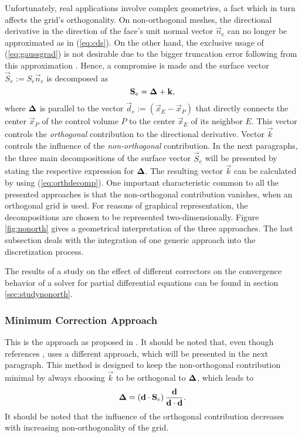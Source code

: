 Unfortunately, real applications involve complex geometries, a fact which in turn affects the grid's orthogonality. On non-orthogonal meshes, the directional derivative in the direction of the face's unit normal vector \(\vec{n}_e\) can no longer be approximated as in (\ref{eq:cds}). On the other hand, the exclusive usage of (\ref{eq:gaussgrad}) is not desirable due to the bigger truncation error following from this approximation \cite{jasak96}. Hence, a compromise is made and the surface vector \(\vec{S}_e := S_e \vec{n}_e\) is decomposed as
\begin{equation}
  \label{eq:orthdecomp}
  \mathbf{S}_e = \boldsymbol{\Delta} + \mathbf{k},
\end{equation}
where \(\boldsymbol{\Delta}\) is parallel to the vector \(\vec{d}_e := \left(\vec{x}_E - \vec{x}_P\right)\) that directly connects the center \(\vec{x}_P\) of the control volume \(P\) to the center \(\vec{x}_E\) of its neighbor \(E\). This vector controls the \emph{orthogonal} contribution to the directional derivative. Vector \(\vec{k}\) controls the influence of the \emph{non-orthogonal} contribution. In the next paragraphs, the three main decompositions of the surface vector \(\vec{S}_e\) will be presented by stating the respective expression for \(\boldsymbol{\Delta}\). The resulting vector \(\vec{k}\) can be calculated by using (\ref{eq:orthdecomp}). One important characteristic common to all the presented approaches is that the non-orthogonal contribution vanishes, when an orthogonal grid is used. For reasons of graphical representation, the decompositions are chosen to be represented two-dimensionally. Figure \ref{fig:nonorth} gives a geometrical interpretation of the three approaches. The last subsection deals with the integration of one generic approach into the discretization process. 

The results of a study on the effect of different correctors on the convergence behavior of a solver for partial differential equations can be found in section \ref{sec:studynonorth}.

\subsubsection{Minimum Correction Approach}

This is the approach as proposed in \cite{muzaferja}. It should be noted that, even though \cite{ferziger02} references \cite{muzaferja}, \cite{ferziger02} uses a different approach, which will be presented in the next paragraph. This method is designed to keep the non-orthogonal contribution minimal by always choosing \(\vec{k}\) to be orthogonal to \(\boldsymbol{\Delta}\), which leads to
\begin{displaymath}
  \boldsymbol{\Delta} = \left( \mathbf{d} \cdot \mathbf{S}_e \right) \frac{\mathbf{d}}{\mathbf{d} \cdot \mathbf{d}}.
\end{displaymath}
It should be noted that the influence of the orthogonal contribution decreases with increasing non-orthogonality of the grid.

